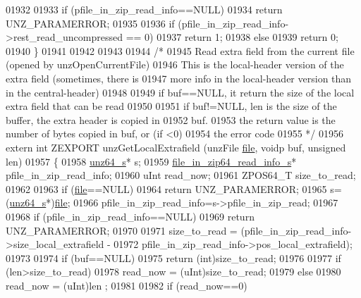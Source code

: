 \begin{DoxyCode}
01932 
01933     \textcolor{keywordflow}{if} (pfile\_in\_zip\_read\_info==NULL)
01934         \textcolor{keywordflow}{return} UNZ\_PARAMERROR;
01935 
01936     \textcolor{keywordflow}{if} (pfile\_in\_zip\_read\_info->rest\_read\_uncompressed == 0)
01937         \textcolor{keywordflow}{return} 1;
01938     \textcolor{keywordflow}{else}
01939         \textcolor{keywordflow}{return} 0;
01940 \}
01941 
01942 
01943 
01944 \textcolor{comment}{/*}
01945 \textcolor{comment}{Read extra field from the current file (opened by unzOpenCurrentFile)}
01946 \textcolor{comment}{This is the local-header version of the extra field (sometimes, there is}
01947 \textcolor{comment}{more info in the local-header version than in the central-header)}
01948 \textcolor{comment}{}
01949 \textcolor{comment}{  if buf==NULL, it return the size of the local extra field that can be read}
01950 \textcolor{comment}{}
01951 \textcolor{comment}{  if buf!=NULL, len is the size of the buffer, the extra header is copied in}
01952 \textcolor{comment}{    buf.}
01953 \textcolor{comment}{  the return value is the number of bytes copied in buf, or (if <0)}
01954 \textcolor{comment}{    the error code}
01955 \textcolor{comment}{*/}
01956 \textcolor{keyword}{extern} \textcolor{keywordtype}{int} ZEXPORT unzGetLocalExtrafield (unzFile \hyperlink{structfile}{file}, voidp buf, \textcolor{keywordtype}{unsigned} len)
01957 \{
01958     \hyperlink{structunz64__s}{unz64\_s}* s;
01959     \hyperlink{structfile__in__zip64__read__info__s}{file\_in\_zip64\_read\_info\_s}* pfile\_in\_zip\_read\_info;
01960     uInt read\_now;
01961     ZPOS64\_T size\_to\_read;
01962 
01963     \textcolor{keywordflow}{if} (\hyperlink{structfile}{file}==NULL)
01964         \textcolor{keywordflow}{return} UNZ\_PARAMERROR;
01965     s=(\hyperlink{structunz64__s}{unz64\_s}*)\hyperlink{structfile}{file};
01966     pfile\_in\_zip\_read\_info=s->pfile\_in\_zip\_read;
01967 
01968     \textcolor{keywordflow}{if} (pfile\_in\_zip\_read\_info==NULL)
01969         \textcolor{keywordflow}{return} UNZ\_PARAMERROR;
01970 
01971     size\_to\_read = (pfile\_in\_zip\_read\_info->size\_local\_extrafield -
01972                 pfile\_in\_zip\_read\_info->pos\_local\_extrafield);
01973 
01974     \textcolor{keywordflow}{if} (buf==NULL)
01975         \textcolor{keywordflow}{return} (\textcolor{keywordtype}{int})size\_to\_read;
01976 
01977     \textcolor{keywordflow}{if} (len>size\_to\_read)
01978         read\_now = (uInt)size\_to\_read;
01979     \textcolor{keywordflow}{else}
01980         read\_now = (uInt)len ;
01981 
01982     \textcolor{keywordflow}{if} (read\_now==0)

\end{DoxyCode}
